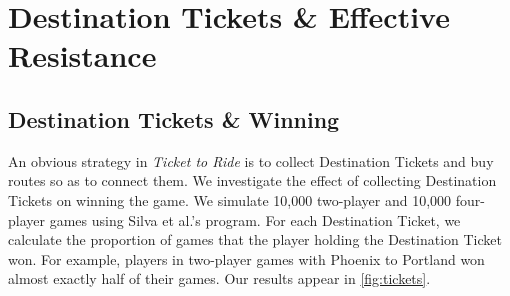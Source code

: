 \newpage
\section{Destination Tickets \& Effective Resistance}

\subsection{Destination Tickets \& Winning}
An obvious strategy in \textit{Ticket to Ride} is to collect
Destination Tickets and buy routes so as to connect them.
We investigate the effect of collecting Destination Tickets
on winning the game.
We simulate 10,000 two-player and 10,000 four-player games
using Silva et al.'s program.
For each Destination Ticket, we calculate the proportion of 
games that the player holding the Destination Ticket won.
For example, players in two-player games with Phoenix to Portland
won almost exactly half of their games.
Our results appear in \cref{fig:tickets}.

